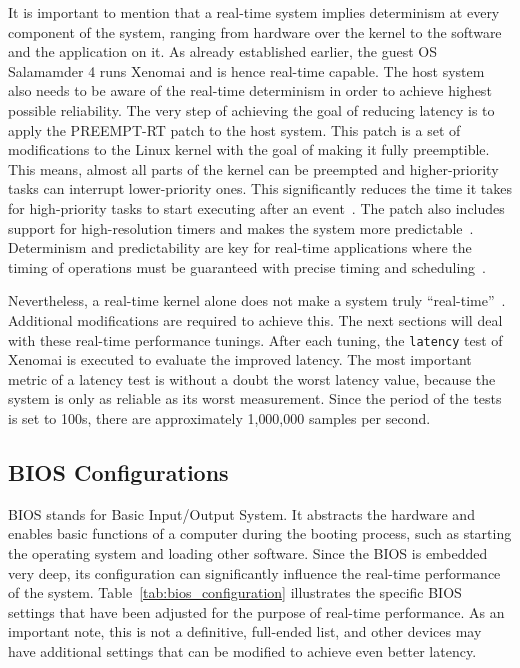 \documentclass[MMR,Master,english]{twbook}
\begin{document}
\bigskip \noindent It is important to mention that a real-time system implies determinism at every component of the system, ranging from hardware over the kernel to the software and the application on it. As already established earlier, the guest OS Salamamder 4 runs Xenomai and is hence real-time capable. The host system also needs to be aware of the real-time determinism in order to achieve highest possible reliability. The very step of achieving the goal of reducing latency is to apply the PREEMPT-RT patch to the host system. This patch is a set of modifications to the Linux kernel with the goal of making it fully preemptible. This means, almost all parts of the kernel can be preempted and higher-priority tasks can interrupt lower-priority ones. This significantly reduces the time it takes for high-priority tasks to start executing after an event~\cite{RealtimeKernelPatchset}. The patch also includes support for high-resolution timers and makes the system more predictable~\cite{lutsykPipelinedMulticoreMachine2020}. Determinism and predictability are key for real-time applications where the timing of operations must be guaranteed with precise timing and scheduling~\cite{rostedtInternalsRTPatch2007}.

\bigskip \noindent Nevertheless, a real-time kernel alone does not make a system truly “real-time”~\cite{WhatRealtimeLinuxa}. Additional modifications are required to achieve this. The next sections will deal with these real-time performance tunings. After each tuning, the \texttt{latency} test of Xenomai is executed to evaluate the improved latency. The most important metric of a latency test is without a doubt the worst latency value, because the system is only as reliable as its worst measurement. Since the period of the tests is set to 100\textmu s, there are approximately 1,000,000 samples per second.

\clearpage

\subsection{BIOS Configurations}\label{subsec:bios_configurations}

BIOS stands for Basic Input/Output System. It abstracts the hardware and enables basic functions of a computer during the booting process, such as starting the operating system and loading other software. Since the BIOS is embedded very deep, its configuration can significantly influence the real-time performance of the system. Table~\ref{tab:bios_configuration} illustrates the specific BIOS settings that have been adjusted for the purpose of real-time performance. As an important note, this is not a definitive, full-ended list, and other devices may have additional settings that can be modified to achieve even better latency.
\end{document}
